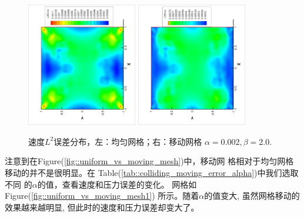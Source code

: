 \documentclass{report}
\theoremstyle{Remark}
\begin{document}
          \begin{figure}[ht]
            \begin{center}
              \includegraphics[width = 0.43\textwidth, angle = -90]{../picture_collidingFlow/uniform20_error.eps}
              \includegraphics[width = 0.43\textwidth, angle = -90]{../picture_collidingFlow/moving20_error.eps}
              \caption{\small 速度$L^2$误差分布，左：均匀网格；右：移动网格 $\alpha = 0.002, \beta = 2.0$.}
              \label{fig::uniform_vs_moving_err}
            \end{center}
          \end{figure}
          
          注意到在Figure(\ref{fig::uniform_vs_moving_mesh})中，移动网
          格相对于均匀网格移动的并不是很明显。在
          Table(\ref{tab::colliding_moving_error_alpha})中我们选取不同
          的$\alpha$的值，查看速度和压力误差的变化。
          网格如Figure(\ref{fig::uniform_vs_moving_mesh1})
          所示。随着$\alpha$的值变大, 虽然网格移动的效果越来越明显,
          但此时的速度和压力误差却变大了。
\end{document}
